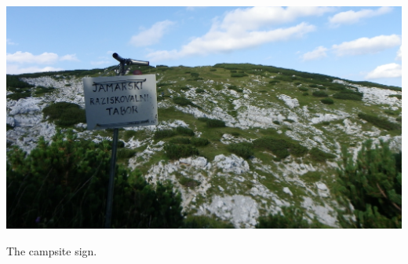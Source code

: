\begin{pagefigure}
\checkoddpage \ifoddpage \forcerectofloat \else \forceversofloat \fi
   \centering
\includegraphics[width = \textwidth]{2012/summary/2012-08-08-19.13.30-Rhys Tyers-Pentax X90-IMGP3418--orig.jpg}
\caption{The campsite sign. } \label{camp sign}
\end{pagefigure}